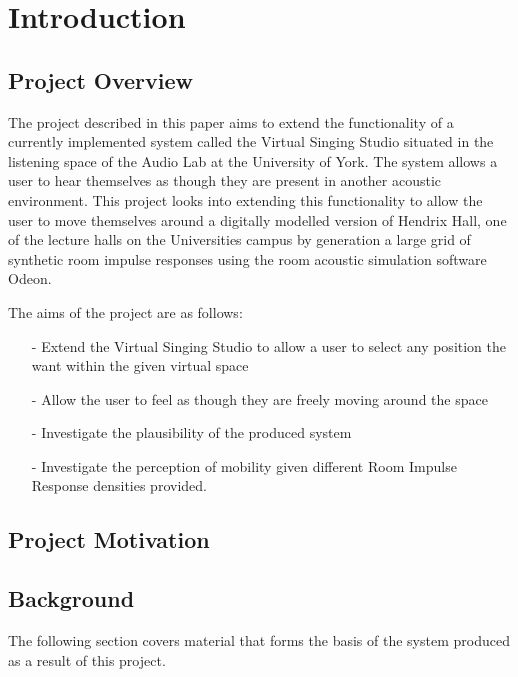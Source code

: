 \documentclass[../../main.tex]{subfiles}
\begin{document}
\section{Introduction}

\subsection{Project Overview}
	The project described in this paper aims to extend the functionality of a currently implemented system called the Virtual Singing Studio situated in the listening space of the Audio Lab at the University of York. The system allows a user to hear themselves as though they are present in another acoustic environment. This project looks into extending this functionality to allow the user to move themselves around a digitally modelled version of Hendrix Hall, one of the lecture halls on the Universities campus by generation a large grid of synthetic room impulse responses using the room acoustic simulation software Odeon.

	The aims of the project are as follows:

	\begin{itemize}
		\item[-] Extend the Virtual Singing Studio to allow a user to select any position the want within the given virtual space
		\item[-] Allow the user to feel as though they are freely moving around the space
		\item[-] Investigate the plausibility of the produced system
		\item[-] Investigate the perception of mobility given different Room Impulse Response densities provided.
	\end{itemize}
	
\subsection{Project Motivation}

\subsection{Background}


	

	The following section covers material that forms the basis of the system produced as a result of this project.
\end{document}
